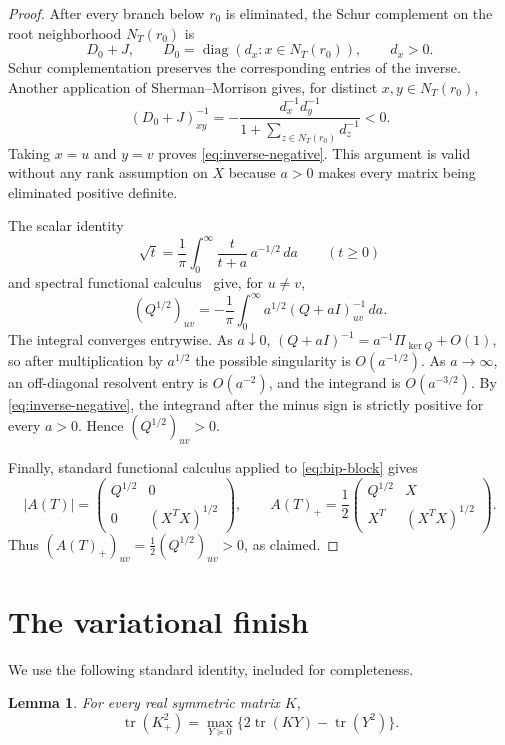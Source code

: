 \documentclass[11pt]{article}
\newtheorem{lemma}[theorem]{Lemma}
\theoremstyle{remark}
\newcommand{\tr}{\operatorname{tr}}
\begin{document}
\begin{proof}
After every branch below $r_0$ is eliminated, the Schur complement on the
root neighborhood $N_T(r_0)$ is
\[
 D_0+J,
 \qquad D_0=\operatorname{diag}(d_x:x\in N_T(r_0)),
 \qquad d_x>0.
\]
Schur complementation preserves the corresponding entries of the inverse.
Another application of Sherman--Morrison gives, for distinct
$x,y\in N_T(r_0)$,
\begin{equation}\label{eq:root-inverse}
 (D_0+J)^{-1}_{xy}
 =-\frac{d_x^{-1}d_y^{-1}}
 {1+\sum_{z\in N_T(r_0)}d_z^{-1}}<0.
\end{equation}
Taking $x=u$ and $y=v$ proves \eqref{eq:inverse-negative}.  This argument is
valid without any rank assumption on $X$ because $a>0$ makes every matrix
being eliminated positive definite.

The scalar identity
\[
 \sqrt t=\frac1\pi\int_0^\infty
 \frac{t}{t+a}\,a^{-1/2}\,da\qquad(t\geq0)
\]
and spectral functional calculus~\cite[Chapter~V]{Bhatia} give, for
$u\ne v$,
\begin{equation}\label{eq:resolvent}
 (Q^{1/2})_{uv}
 =-\frac1\pi\int_0^\infty
 a^{1/2}(Q+aI)^{-1}_{uv}\,da.
\end{equation}
The integral converges entrywise.  As $a\downarrow0$,
$(Q+aI)^{-1}=a^{-1}\Pi_{\ker Q}+O(1)$, so after multiplication by
$a^{1/2}$ the possible singularity is $O(a^{-1/2})$.  As $a\to\infty$, an
off-diagonal resolvent entry is $O(a^{-2})$, and the integrand is
$O(a^{-3/2})$.  By
\eqref{eq:inverse-negative}, the integrand after the minus sign is strictly
positive for every $a>0$.  Hence $(Q^{1/2})_{uv}>0$.

Finally, standard functional calculus applied to \eqref{eq:bip-block} gives
\[
 |A(T)|=
 \begin{pmatrix}Q^{1/2}&0\\0&(X^TX)^{1/2}\end{pmatrix},
 \qquad
 A(T)_+=\frac12
 \begin{pmatrix}Q^{1/2}&X\\X^T&(X^TX)^{1/2}\end{pmatrix}.
\]
Thus $(A(T)_+)_{uv}=\tfrac12(Q^{1/2})_{uv}>0$, as claimed.
\end{proof}

\section{The variational finish}

We use the following standard identity, included for completeness.

\begin{lemma}\label{lem:variational}
For every real symmetric matrix $K$,
\begin{equation}\label{eq:variational}
 \tr(K_+^2)=\max_{Y\succeq0}
 \bigl\{2\tr(KY)-\tr(Y^2)\bigr\}.
\end{equation}
\end{lemma}
\end{document}
